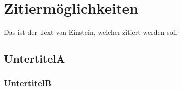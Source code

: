\Author{\daAuthorOne}  %


\chapter{Zitiermöglichkeiten}

Das ist der Text von Einstein, welcher zitiert werden soll \autocite{einstein}

\lipsum[1]

\section{UntertitelA}

\lipsum[2]

\subsection{UntertitelB}

\lipsum[2]

